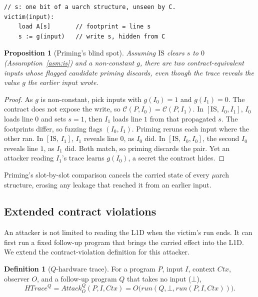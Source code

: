 \documentclass[letterpaper,twocolumn,10pt]{article}
\makeatletter
\newtheorem{proposition}{Proposition}
\theoremstyle{definition}
\newtheorem{definition}{Definition}
\providecommand{\run}{\ensuremath{\mathit{run}}}
\providecommand{\IS}{\ensuremath{\mathrm{IS}}}
\providecommand{\obs}{\ensuremath{O}}
\providecommand{\AQ}[1]{\ensuremath{\mathit{Attack}^{Q}_{#1}}}
\providecommand{\batch}[1]{\ensuremath{[\IS,\,#1]}}
\def\uarch@bold#1#2\@nil{\if b#1\boldmath\fi}
\DeclareRobustCommand{\uarch}{{\expandafter\uarch@bold\f@series\@nil\ensuremath{\mu}}arch\xspace}
\makeatother
\begin{document}
{\footnotesize
\begin{verbatim}
// s: one bit of a uarch structure, unseen by C.
victim(input):
    load A[s]       // footprint = line s
    s := g(input)   // write s, hidden from C
\end{verbatim}
}

\begin{proposition}[Priming's blind spot]
\label{prop:priming-blind}
Assuming $\IS$ clears $s$ to $0$ (Assumption~\ref{asm:is}) and a non-constant $g$, there are two
contract-equivalent inputs whose flagged candidate priming discards, even though the trace reveals
the value $g$ the earlier input wrote.
\end{proposition}
\begin{proof}
As $g$ is non-constant, pick inputs with $g(I_0)=1$ and $g(I_1)=0$. The contract does not expose the write, so
$\mathcal{C}(P,I_0)=\mathcal{C}(P,I_1)$. In $\batch{I_0,I_1}$, $I_0$ loads line $0$ and sets $s=1$,
then $I_1$ loads line $1$ from that propagated $s$. The footprints differ, so fuzzing flags
$(I_0,I_1)$. Priming reruns each input where the other ran. In $\batch{I_1}$, $I_1$ reveals line $0$,
as $I_0$ did. In $\batch{I_0,I_0}$, the second $I_0$ reveals line $1$, as $I_1$ did. Both match, so
priming discards the pair. Yet an attacker reading $I_1$'s trace learns $g(I_0)$, a secret the
contract hides.
\end{proof}

\noindent Priming's slot-by-slot comparison cancels the carried state of every \uarch structure,
erasing any leakage that reached it from an earlier input.

\subsection{Extended contract violations}
\label{sec:detect-observable}

An attacker is not limited to reading the L1D when the victim's run ends. It can first run a fixed
follow-up program that brings the carried effect into the L1D. We extend the contract-violation definition
for this attacker.

\begin{definition}[$Q$-hardware trace]
\label{def:qhtrace}
For a program $P$, input $I$, context $\mathit{Ctx}$, observer $\obs$, and a follow-up program $Q$
that takes no input ($\bot$),
\begin{equation}
\mathit{HTrace}^Q = \AQ{\obs}(P,I,\mathit{Ctx}) = \obs\big(\run(Q,\bot,\run(P,I,\mathit{Ctx}))\big).
\end{equation}
\end{definition}
\end{document}
